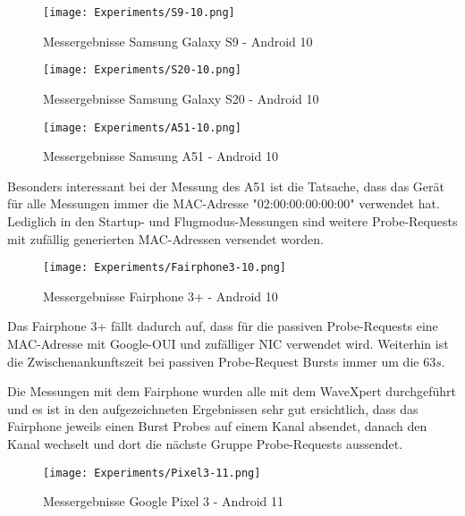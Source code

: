 \begin{figure}[h!]
    \centering
    \texttt{[image: Experiments/S9-10.png]}
    \caption{Messergebnisse Samsung Galaxy S9 - Android 10}
    \label{figure:androidmeasurementsbycategorys9}
\end{figure}

\begin{figure}[h!]
    \centering
    \texttt{[image: Experiments/S20-10.png]}
    \caption{Messergebnisse Samsung Galaxy S20 - Android 10}
    \label{figure:androidmeasurementsbycategorys20}
\end{figure}

\clearpage

\begin{figure}[h!]
    \centering
    \texttt{[image: Experiments/A51-10.png]}
    \caption{Messergebnisse Samsung A51 - Android 10}
    \label{figure:androidmeasurementsbycategorya51}
\end{figure}

Besonders interessant bei der Messung des A51 ist die Tatsache, dass 
das Gerät für alle Messungen immer die MAC-Adresse "02:00:00:00:00:00"
verwendet hat. Lediglich in den Startup- und Flugmodus-Messungen sind 
weitere Probe-Requests mit zufällig generierten MAC-Adressen versendet worden.

\clearpage

\begin{figure}[h!]
    \centering
    \texttt{[image: Experiments/Fairphone3-10.png]}
    \caption{Messergebnisse Fairphone 3+ - Android 10}
    \label{figure:androidmeasurementsbycategoryfairphone}
\end{figure}


Das Fairphone 3+ fällt dadurch auf, dass für die passiven Probe-Requests eine
MAC-Adresse mit Google-OUI und zufälliger NIC verwendet wird. Weiterhin 
ist die Zwischenankunftszeit bei passiven Probe-Request Bursts immer um die 
$63 s$. 

Die Messungen mit dem Fairphone wurden alle mit dem WaveXpert durchgeführt
und es ist in den aufgezeichneten Ergebnissen sehr gut ersichtlich, dass
das Fairphone jeweils einen Burst Probes auf einem Kanal absendet, danach 
den Kanal wechselt und dort die nächste Gruppe Probe-Requests aussendet. 

\begin{figure}[h!]
    \centering
    \texttt{[image: Experiments/Pixel3-11.png]}
    \caption{Messergebnisse Google Pixel 3 - Android 11}
    \label{figure:androidmeasurementsbycategorypixel}
\end{figure}

